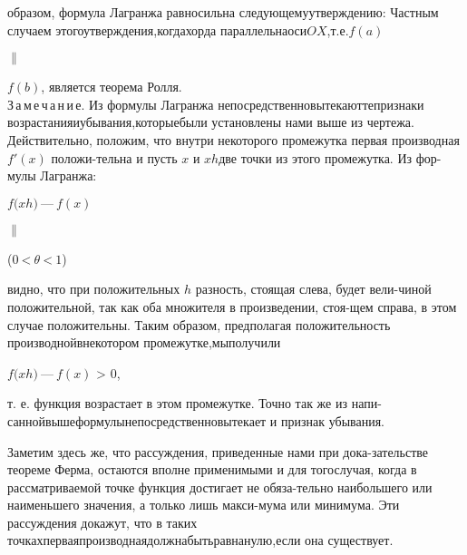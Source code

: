 \documentclass[a5paper]{article}
\begin{document}
	\vspace{-3.8mm}
	\noindent
	образом, формула Лагранжа равносильна следующему\;\;утверждению:\; Частным случаем этого\;\;утверждения,\;когда\;\;хорда параллельна\;\;\;оси\;\;\;$OX$,\;\;\;т.е.\;\;\;$f(a)$\;\;\;\begin{rotate}{90}$\parallel$\end{rotate}\;\;$f(b)$, является теорема Ролля.\\
	\indent З\,а\,м\,е\,ч\,а\,н\,и\,е. Из формулы Лагранжа непосредственно\;\;\;вытекают\;\;те\;\;признаки возрастания\;\;и\;\;убывания,\;\;которые\;\;были установлены нами выше из чертежа. Действительно, положим, что внутри некоторого промежутка первая производная $ f'(x)$ положи-\linebreak тельна и пусть $x$ и $x$\:{\Large+}\:$h$\;\;две точки из этого промежутка. Из фор-\linebreak мулы Лагранжа:
	\vspace{-1.5mm}
	\begin{center}
		{\large$f(x$\:{\Large+}\:$h)\:\text{—}\:f(x)$}\;\;\;\begin{rotate}{90}$\parallel$\end{rotate}\; \hspace{1.2cm} ($0\:${\huge <}$\:\theta\:${\huge <}$\:1$)
	\end{center}

	\noindent
	видно, что при положительных $h$ разность, стоящая слева, будет вели-\linebreak чиной положительной, так как оба множителя в произведении, стоя-\linebreak щем справа, в этом случае положительны. Таким образом, предполагая положительность производной\quad в\quad некотором промежутке,\;\;\;мы\;\;\;получили
	\begin{center}
		{\large$f(x$\:{\LARGE+}\:$h)\:\text{—}\:f(x)$ {\huge>} $0$},
	\end{center}
	т. е. функция возрастает в этом промежутке. Точно так же из напи-\linebreak санной\;\;\;выше\;\;\;формулы\;\;\;непосредственно\;\;\;вытекает и признак убывания.
	
	Заметим здесь же, что рассуждения, приведенные нами при дока-\linebreak зательстве теореме Ферма, остаются вполне применимыми и для того\linebreak случая, когда в рассматриваемой точке функция достигает не обяза-\linebreak тельно наибольшего или наименьшего значения, а только лишь макси-\linebreak мума или минимума. Эти рассуждения докажут, что в таких точках\linebreak первая\;\;\;производная\;\;\;должна\;\;\;быть\;\;\;равна\;\;\;нулю,\;\;\;если она существует.
\end{document}
